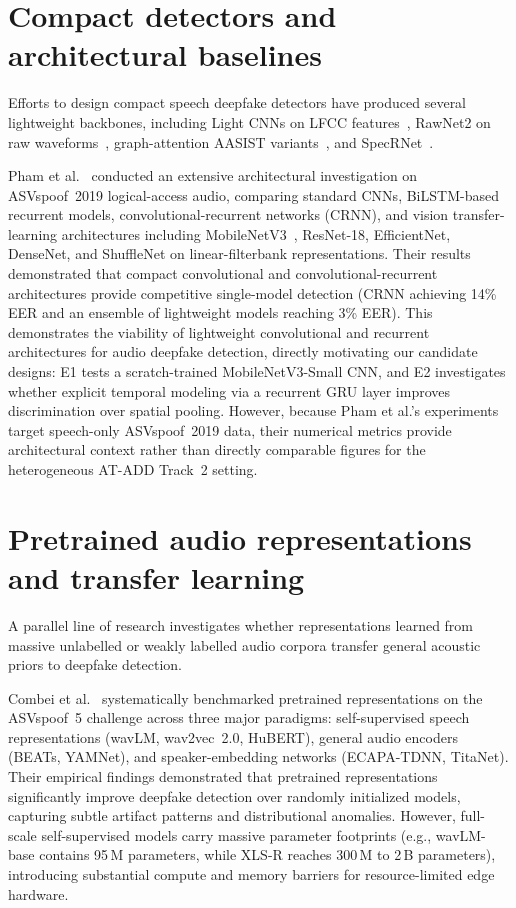 \section{Compact detectors and architectural baselines}

Efforts to design compact speech deepfake detectors have produced several lightweight backbones, including Light CNNs on LFCC features~\cite{lavrentyeva2019stc}, RawNet2 on raw waveforms~\cite{tak2021rawnet2}, graph-attention AASIST variants~\cite{jung2022aasist}, and SpecRNet~\cite{kawa2022specrnet}. 

Pham et al.~\cite{pham2024deepfake} conducted an extensive architectural investigation on ASVspoof~2019 logical-access audio, comparing standard CNNs, BiLSTM-based recurrent models, convolutional-recurrent networks (CRNN), and vision transfer-learning architectures including MobileNetV3~\cite{howard2019mobilenetv3}, ResNet-18, EfficientNet, DenseNet, and ShuffleNet on linear-filterbank representations. Their results demonstrated that compact convolutional and convolutional-recurrent architectures provide competitive single-model detection (CRNN achieving 14\% EER and an ensemble of lightweight models reaching 3\% EER). This demonstrates the viability of lightweight convolutional and recurrent architectures for audio deepfake detection, directly motivating our candidate designs: E1 tests a scratch-trained MobileNetV3-Small CNN, and E2 investigates whether explicit temporal modeling via a recurrent GRU layer improves discrimination over spatial pooling. However, because Pham et al.'s experiments target speech-only ASVspoof~2019 data, their numerical metrics provide architectural context rather than directly comparable figures for the heterogeneous AT-ADD Track~2 setting.

\section{Pretrained audio representations and transfer learning}

A parallel line of research investigates whether representations learned from massive unlabelled or weakly labelled audio corpora transfer general acoustic priors to deepfake detection.

Combei et al.~\cite{combei2024wavlm} systematically benchmarked pretrained representations on the ASVspoof~5 challenge across three major paradigms: self-supervised speech representations (wavLM, wav2vec~2.0, HuBERT), general audio encoders (BEATs, YAMNet), and speaker-embedding networks (ECAPA-TDNN, TitaNet). Their empirical findings demonstrated that pretrained representations significantly improve deepfake detection over randomly initialized models, capturing subtle artifact patterns and distributional anomalies. However, full-scale self-supervised models carry massive parameter footprints (e.g., wavLM-base contains 95\,M parameters, while XLS-R reaches 300\,M to 2\,B parameters), introducing substantial compute and memory barriers for resource-limited edge hardware.

